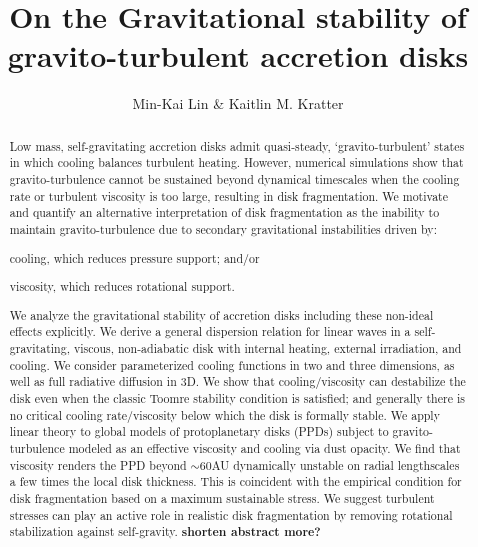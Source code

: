\documentclass[iop, numberedappendix]{emulateapj}
\begin{document}
\title{On the Gravitational stability of gravito-turbulent accretion disks}
\author{Min-Kai Lin \& Kaitlin M. Kratter}

\begin{abstract}
Low mass, self-gravitating accretion disks admit quasi-steady,
`gravito-turbulent' states in which cooling balances turbulent
heating. However, numerical simulations show that gravito-turbulence
cannot be sustained beyond dynamical timescales when the cooling rate
or turbulent viscosity is too large, resulting in disk fragmentation.        
We motivate and quantify an alternative interpretation of disk
fragmentation as the inability to maintain gravito-turbulence due to  
secondary gravitational instabilities driven by:  
\begin{inparaenum}[1)] 
\item 
  cooling, which reduces pressure support; and/or
\item 
  viscosity, which reduces rotational support. 
\end{inparaenum}
We analyze the gravitational stability of accretion disks 
including these non-ideal effects explicitly.    
We derive a general dispersion relation for linear waves in a 
self-gravitating, viscous, non-adiabatic disk with internal heating,
external irradiation, and cooling. We  
consider parameterized cooling functions in two and three dimensions,
as well as full radiative diffusion in 3D. We show that 
cooling/viscosity can destabilize the disk even when the classic
Toomre stability condition is satisfied; and generally there is
no critical cooling rate/viscosity below which the disk is formally
stable. %
We apply linear theory to 
global models of protoplanetary disks (PPDs) subject to
gravito-turbulence modeled as an effective 
viscosity and cooling via dust opacity. 
We find that viscosity renders the PPD beyond $\sim 60$AU dynamically
unstable on radial %
lengthscales a few times the local disk thickness. This is coincident 
with the empirical condition for disk fragmentation based on a
maximum sustainable stress. 
We suggest turbulent stresses can play an active role in realistic disk 
fragmentation by removing rotational stabilization against 
self-gravity. {\bf shorten abstract more?}
\end{abstract}
\end{document}
